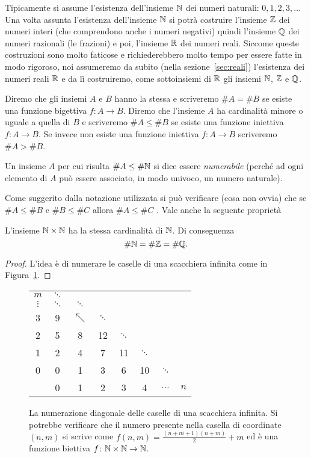 Tipicamente si assume l'esistenza dell'insieme $\mathbb N$ dei numeri naturali: $0,1,2,3,\dots$
Una volta assunta l'esistenza dell'insieme $\mathbb N$ si potrà costruire l'insieme
$\mathbb Z$ dei numeri interi (che comprendono anche i numeri negativi) quindi
l'insieme $\mathbb Q$ dei numeri razionali (le frazioni) e poi,
l'insieme $\mathbb R$ dei numeri reali.
Siccome queste costruzioni sono molto faticose
e richiederebbero molto tempo per essere fatte in modo rigoroso, noi
assumeremo da subito (nella sezione~\ref{sec:reali})
l'esistenza dei numeri reali $\mathbb R$ e da lì costruiremo,
come sottoinsiemi di $\mathbb R$ gli insiemi $\mathbb N$, $\mathbb Z$ e $\mathbb Q$.

\begin{definition}[cardinalità]
Diremo che gli insiemi $A$ e $B$ hanno la stessa 
e scriveremo $\# A = \# B$
se esiste una funzione bigettiva $f\colon A \to B$.
Diremo che l'insieme $A$ ha cardinalità minore o uguale a quella di $B$
e scriveremo $\#A \le \#B$ se esiste una funzione iniettiva $f\colon A \to B$.
Se invece non esiste una funzione iniettiva $f\colon A \to B$ scriveremo
$\#A > \#B$.

Un insieme $A$ per cui risulta $\#A \le \#\mathbb N$ si dice essere \emph{numerabile}
(perché ad ogni elemento di $A$ può essere associato, in modo univoco, un numero
naturale).
\end{definition}

Come suggerito dalla notazione utilizzata si può verificare (cosa non ovvia)
che se $\#A \le \#B$ e $\#B \le \#C$ allora $\#A \le \#C$
\cite[teorema di Cantor-Bernstein]{appunti_logica}.
Vale anche la seguente proprietà

\begin{theorem}
  L'insieme $\mathbb N \times \mathbb N$ ha la stessa cardinalità di $\mathbb N$. Di conseguenza
  \[
    \# \mathbb N = \# \mathbb Z = \# \mathbb Q.
  \]
\end{theorem}
%
\begin{proof}
L'idea è di numerare le caselle di una scacchiera infinita
come in Figura~\ref{fig:cantor1}.
\end{proof}

\begin{figure}
  \begin{tabular}{c|ccccccc}
   $m$ & $\ddots$\\
   $\vdots$ & $\ddots$ & $\ddots$\\
   3 & 9 & $\nwarrow$ & $\ddots$ \\
   2 & 5 & 8 & 12 & $\ddots$ \\
   1 & 2 & 4 & 7 & 11 & $\ddots$ \\
   0 & 0 & 1 & 3 & 6 & 10 & $\ddots$ \\ \hline
     & 0 & 1 & 2 & 3 & 4 & $\dots$ & $n$
  \end{tabular}
  \caption{
    La numerazione diagonale delle caselle
    di una scacchiera infinita. Si potrebbe verificare
    che il numero presente nella casella di coordinate $(n,m)$
    si scrive come $f(n,m) = \frac{(n+m+1)(n+m)}{2}+m$
    ed è una funzione biettiva $f\colon \mathbb N\times\mathbb N \to\mathbb N$.}
  \label{fig:cantor1}
\end{figure}


